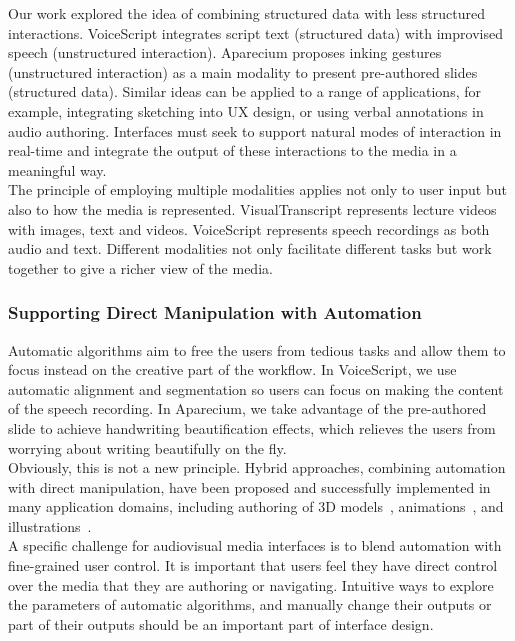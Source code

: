 Our work explored the idea of combining structured data with less structured interactions. VoiceScript integrates script text (structured data) with improvised speech (unstructured interaction). Aparecium proposes inking gestures (unstructured interaction) as a main modality to present pre-authored slides (structured data). Similar ideas can be applied to a range of applications, for example, integrating sketching into UX design, or using verbal annotations in audio authoring. Interfaces must seek to support natural modes of interaction in real-time and integrate the output of these interactions to the media in a meaningful way. \\

The principle of employing multiple modalities applies not only to user input but also to how the media is represented. VisualTranscript represents lecture videos with images, text and videos. VoiceScript represents speech recordings as both audio and text. Different modalities not only facilitate different tasks but work together to give a richer view of the media.

\subsubsection{Supporting Direct Manipulation with Automation}
Automatic algorithms aim to free the users from tedious tasks and allow them to focus instead on the creative part of the workflow. In VoiceScript, we use automatic alignment and segmentation so users can focus on making the content of the speech recording. In Aparecium, we take advantage of the pre-authored slide to achieve handwriting beautification effects, which relieves the users from worrying about writing beautifully on the fly.\\ 

Obviously, this is not a new principle. Hybrid approaches, combining automation with direct manipulation, have been proposed and successfully implemented in many application domains, including authoring of 3D models~\cite{gal2009iwires,prevost2013make}, animations~\cite{bai2016artist}, and illustrations~\cite{chi2016authoring,xing2016energy}. \\

A specific challenge for audiovisual media interfaces is to blend automation with fine-grained user control. It is important that users feel they have direct control over the media that they are authoring or navigating. Intuitive ways to explore the parameters of automatic algorithms, and manually change their outputs or part of their outputs should be an important part of interface design.

